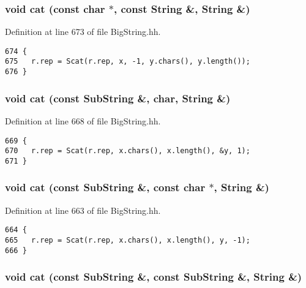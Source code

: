 \subsubsection{\setlength{\rightskip}{0pt plus 5cm}void cat (const char $\ast$, const String \&, String \&)\hspace{0.3cm}{\tt  [friend]}}\label{classString_l9}




Definition at line 673 of file Big\-String.hh.



\footnotesize\begin{verbatim}674 {
675   r.rep = Scat(r.rep, x, -1, y.chars(), y.length());
676 }
\end{verbatim}\normalsize 
{}
\subsubsection{\setlength{\rightskip}{0pt plus 5cm}void cat (const {\bf Sub\-String} \&, char, String \&)\hspace{0.3cm}{\tt  [friend]}}\label{classString_l8}




Definition at line 668 of file Big\-String.hh.



\footnotesize\begin{verbatim}669 {
670   r.rep = Scat(r.rep, x.chars(), x.length(), &y, 1);
671 }
\end{verbatim}\normalsize 
{}
\subsubsection{\setlength{\rightskip}{0pt plus 5cm}void cat (const {\bf Sub\-String} \&, const char $\ast$, String \&)\hspace{0.3cm}{\tt  [friend]}}\label{classString_l7}




Definition at line 663 of file Big\-String.hh.



\footnotesize\begin{verbatim}664 {
665   r.rep = Scat(r.rep, x.chars(), x.length(), y, -1);
666 }
\end{verbatim}\normalsize 
{}
\subsubsection{\setlength{\rightskip}{0pt plus 5cm}void cat (const {\bf Sub\-String} \&, const {\bf Sub\-String} \&, String \&)\hspace{0.3cm}{\tt  [friend]}}\label{classString_l6}




